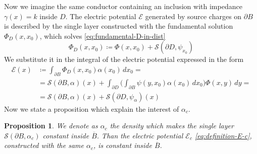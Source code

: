 \documentclass[10pt, a4paper, twoside, openright]{book}
\theoremstyle{definition}
\theoremstyle{plain}
\theoremstyle{plain}
\theoremstyle{plain}
\newtheorem{proposition}[subsection]{Proposition}
\theoremstyle{plain}
\theoremstyle{plain}
\theoremstyle{plain}
\theoremstyle{plain}
\theoremstyle{plain}
\begin{document}
\par
Now we imagine the same conductor containing an inclusion with impedance $\gamma(x)=k$ inside $D$. The electric potential $\mathcal{E}$ generated by source charges on $\partial B$ is described by the single layer constructed with the fundamental solution $\Phi_D(x,x_0)$, which solves \eqref{eq:fundamental-D-in-dist}
\begin{equation}
 \Phi_D(x,x_0)\coloneqq\Phi(x,x_0)+\mathcal{S}(\partial D,\psi_{x_0})\label{eq:decomposition-Phi-D}
\end{equation}
We substitute it in the integral of the electric potential expressed in the form
\begin{align}
 \mathcal{E}(x)&\coloneqq\int_{\partial B}\Phi_D(x,x_0)\alpha(x_0)\,dx_0= \label{eq:definition-E-c}\\
  &=\mathcal{S}(\partial B, \alpha)(x) + \int_{\partial D} \Big(\int_{\partial B}\psi(y,x_0)\alpha(x_0)\,dx_0\Big)\Phi(x,y)\,dy = \\
  &=\mathcal{S}(\partial B, \alpha)(x) + \mathcal{S}(\partial D, \psi_{\alpha})(x) \label{eq:decomposition-E-c}
\end{align}
Now we state a proposition which explain the interest of $\alpha_{c}$.
\begin{proposition}
\label{prop:alpha_c-both-problems}
 We denote as $\alpha_{c}$ the density which makes the single layer $\mathcal{S}(\partial B, \alpha_{c})$ constant inside $\overline{B}$.
 Than the electric potential $\mathcal{E}_{c}$ \eqref{eq:definition-E-c}, constructed with the same $\alpha_{c}$, is constant inside $\overline{B}$.
\end{proposition}
\end{document}
